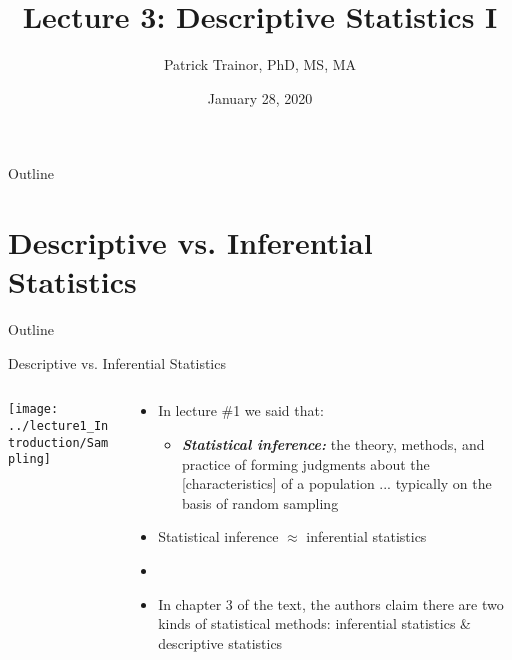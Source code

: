 \documentclass[xcolor=dvipsnames]{beamer}
\title[Lecture 3]{Lecture 3: Descriptive Statistics I}
\author[Patrick Trainor]{Patrick Trainor, PhD, MS, MA}
\institute[NMSU]{New Mexico State University}
\date{January 28, 2020}
\begin{document}
	
\begin{frame}
	\maketitle
\end{frame}

\begin{frame}{Outline}
\tableofcontents[hideallsubsections]
\end{frame}

\section{Descriptive vs. Inferential Statistics}
\begin{frame}{Outline}
\tableofcontents[currentsection,subsectionstyle=show/shaded/hide]
\end{frame}

\begin{frame}{Descriptive vs. Inferential Statistics}
\begin{columns}
	\begin{column}{0.5 \textwidth}
		\texttt{[image: ../lecture1\_Introduction/Sampling]}
	\end{column}
	\begin{column}{0.5 \textwidth}
		\begin{itemize}
		\item In lecture \#1 we said that:
		\begin{itemize}
			\item \textbf{\emph{Statistical inference:}} the theory, methods, and practice of forming judgments about the [characteristics] of a population ... typically on the basis of random sampling \pause
		\end{itemize}
		\item Statistical inference $\approx$ inferential statistics \pause
		\item[]
		\item In chapter 3 of the text, the authors claim there are two kinds of statistical methods: inferential statistics \& descriptive statistics \pause
		\end{itemize}
	\end{column}
\end{columns}
\end{frame}
\end{document}
